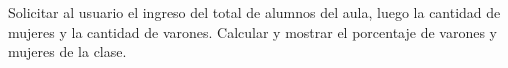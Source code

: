 ﻿
Solicitar al usuario el ingreso del total de alumnos del aula, luego la cantidad de mujeres y la cantidad de varones. Calcular y mostrar el porcentaje de varones y mujeres de la clase.


\newpage
{}

\volverindice
\newpage
